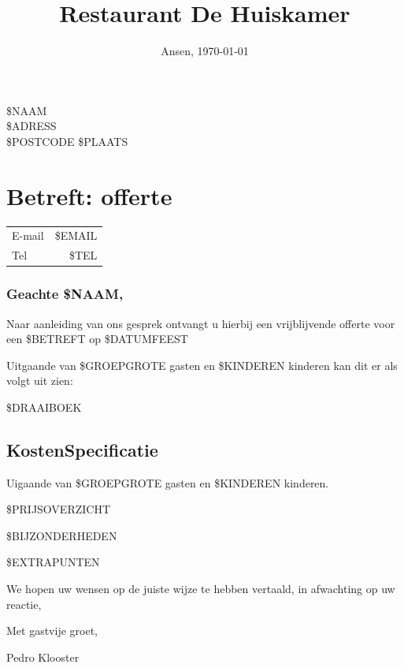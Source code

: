 \documentclass{scrartcl}
\begin{document}

\title{Restaurant De Huiskamer}
\date{Ansen, \today}
\maketitle
\thispagestyle{footer}

\begin{flushright}
	\$NAAM \\
	\$ADRESS \\
	\$POSTCODE \$PLAATS
\end{flushright}
\section*{Betreft: offerte}
\begin{tabular}{l r}
  E-mail & \$EMAIL  \\
  Tel & \$TEL  \\
\end{tabular}

\subsubsection*{Geachte \$NAAM,}

Naar aanleiding van ons gesprek ontvangt u hierbij een vrijblijvende offerte
voor een \$BETREFT op \$DATUMFEEST

Uitgaande van \$GROEPGROTE gasten en \$KINDEREN kinderen kan dit er als volgt uit zien:

\$DRAAIBOEK

\newpage

\subsection*{KostenSpecificatie}
Uigaande van \$GROEPGROTE gasten en \$KINDEREN kinderen.

\$PRIJSOVERZICHT

\$BIJZONDERHEDEN

\$EXTRAPUNTEN

We hopen uw wensen op de juiste wijze te hebben vertaald, in afwachting op uw reactie,

Met gastvije groet,

Pedro Klooster
\end{document}
